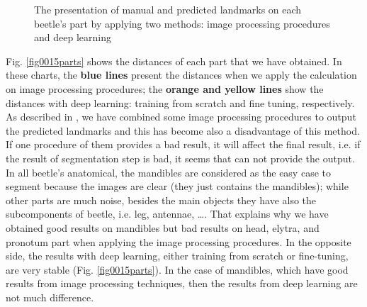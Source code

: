 \documentclass[review]{elsarticle}
\begin{document}
\begin{figure}[htbp]
    \caption{The presentation of manual and predicted landmarks on each beetle's part by applying two methods: image processing procedures and deep learning }
    \label{figmn5parts}
\end{figure}

Fig. \ref{fig0015parts} shows the distances of each part that we have obtained. In these charts, the \textbf{blue lines} present the distances when we apply the calculation on image processing procedures; the \textbf{orange and yellow lines} show the distances with deep learning: training from scratch and fine tuning, respectively. As described in \cite{le2017maelab}, we have combined some image processing procedures to output the predicted landmarks and this has become also a disadvantage of this method. If one procedure of them provides a bad result, it will affect the final result, i.e. if the result of segmentation step is bad, it seems that can not provide the output. In all beetle's anatomical, the mandibles are considered as the easy case to segment because the images are clear (they just contains the mandibles); while other parts are much noise, besides the main objects they have also the subcomponents of beetle, i.e. leg, antennae, \ldots. That explains why we have obtained good results on mandibles but bad results on head, elytra, and pronotum part when applying the image processing procedures. In the opposite side, the results with deep learning, either training from scratch or fine-tuning, are very stable (Fig. \ref{fig0015parts}). In the case of mandibles, which have good results from image processing techniques, then the results from deep learning are not much difference.
\end{document}
